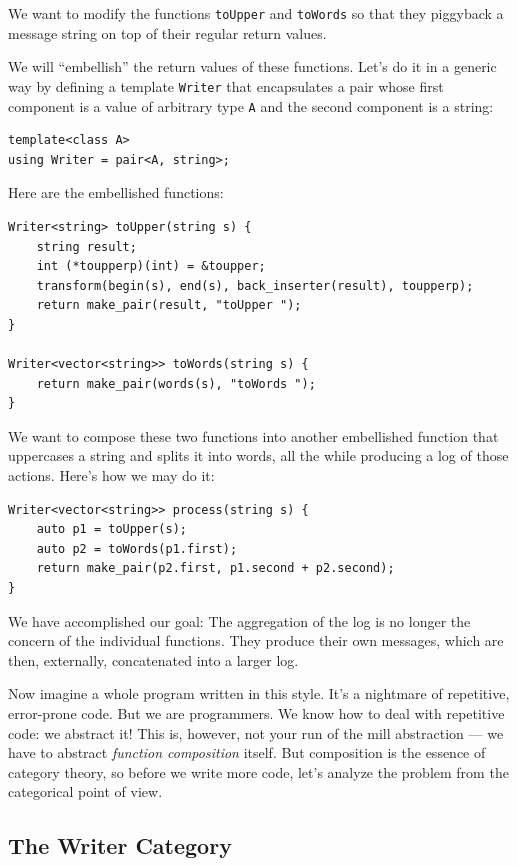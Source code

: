 We want to modify the functions \texttt{toUpper} and \texttt{toWords} so
that they piggyback a message string on top of their regular return
values.

We will ``embellish'' the return values of these functions. Let's do it
in a generic way by defining a template \texttt{Writer} that
encapsulates a pair whose first component is a value of arbitrary type
\texttt{A} and the second component is a string:

\begin{verbatim}
template<class A>
using Writer = pair<A, string>;
\end{verbatim}

Here are the embellished functions:

\begin{verbatim}
Writer<string> toUpper(string s) {
    string result;
    int (*toupperp)(int) = &toupper;
    transform(begin(s), end(s), back_inserter(result), toupperp);
    return make_pair(result, "toUpper "); 
}

Writer<vector<string>> toWords(string s) { 
    return make_pair(words(s), "toWords ");
}
\end{verbatim}

We want to compose these two functions into another embellished function
that uppercases a string and splits it into words, all the while
producing a log of those actions. Here's how we may do it:

\begin{verbatim}
Writer<vector<string>> process(string s) {
    auto p1 = toUpper(s);
    auto p2 = toWords(p1.first);
    return make_pair(p2.first, p1.second + p2.second);
}
\end{verbatim}

We have accomplished our goal: The aggregation of the log is no longer
the concern of the individual functions. They produce their own
messages, which are then, externally, concatenated into a larger log.

Now imagine a whole program written in this style. It's a nightmare of
repetitive, error-prone code. But we are programmers. We know how to
deal with repetitive code: we abstract it! This is, however, not your
run of the mill abstraction --- we have to abstract \emph{function
composition} itself. But composition is the essence of category theory,
so before we write more code, let's analyze the problem from the
categorical point of view.

\subsection{The Writer Category}\label{the-writer-category}

